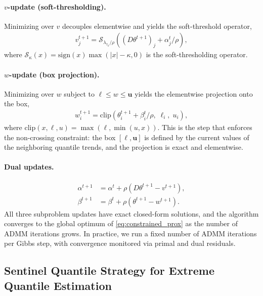 \paragraph{$v$-update (soft-thresholding).}
Minimizing over $v$ decouples elementwise and yields the soft-threshold operator,
\begin{align*}
    v_j^{t+1} = \mathcal{S}_{\lambda_{\tau_k}/\rho}\!\left(
    (D\theta^{t+1})_j + \alpha_j^t / \rho
    \right),
\end{align*}
where $\mathcal{S}_\kappa(x) = \mathrm{sign}(x)\max(|x| - \kappa, 0)$ is the soft-thresholding operator.

\paragraph{$w$-update (box projection).}
Minimizing over $w$ subject to $\boldsymbol{\ell} \leq w \leq \mathbf{u}$ yields the elementwise projection onto the box,
\begin{align*}
    w_{i}^{t+1} = \mathrm{clip}\!\left(
    \theta_i^{t+1} + \beta_i^t / \rho,\;
    \ell_i,\; u_i
    \right),
\end{align*}
where $\mathrm{clip}(x, \ell, u) = \max(\ell, \min(u, x))$. This is the step that enforces the non-crossing constraint: the box $[\boldsymbol{\ell}, \mathbf{u}]$ is defined by the current values of the neighboring quantile trends, and the projection is exact and elementwise.

\paragraph{Dual updates.}
\begin{align*}
    {\alpha}^{t+1} &= {\alpha}^t
    + \rho(D\theta^{t+1} - v^{t+1}), \\
    {\beta}^{t+1} &= {\beta}^t
    + \rho(\theta^{t+1} - w^{t+1}).
\end{align*}
All three subproblem updates have exact closed-form solutions, and the algorithm converges to the global optimum of \eqref{eq:constrained_prox} as the number of ADMM iterations grows. In practice, we run a fixed number of ADMM iterations per Gibbs step, with convergence monitored via primal and dual residuals.

\subsection{Sentinel Quantile Strategy for Extreme Quantile Estimation}
\label{subsec:sentinel}


